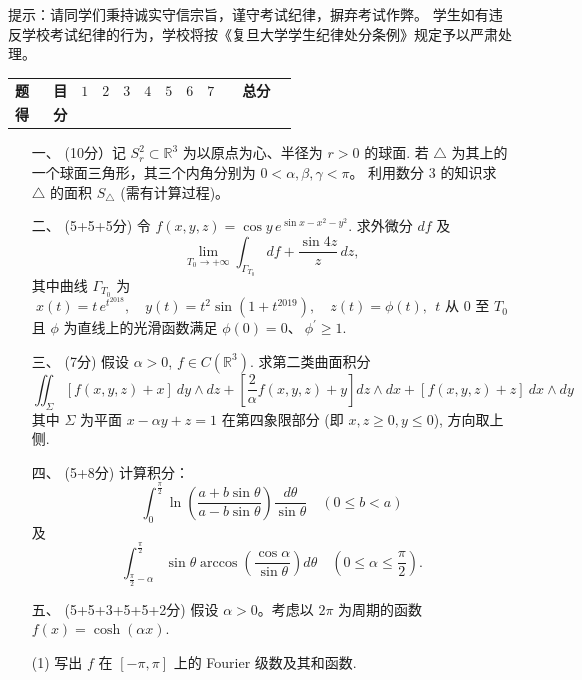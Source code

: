 \qquad 提示：请同学们秉持诚实守信宗旨，谨守考试纪律，摒弃考试作弊。
学生如有违反学校考试纪律的行为，学校将按《复旦大学学生纪律处分条例》规定予以严肃处理。

\begin{table}\begin{tabular}{|c|c|c|c|}
\textbf{题\ \ \ 目} &\quad$1$\quad&\quad$2$\quad&\quad$3$\quad&\quad$4$\quad&\quad$5$\quad&\quad$6$\quad&\quad$7$\quad&\ \ \textbf{总分}\ \ \\
\textbf{得\ \ \ 分} & & & & & & & & 
\end{tabular}\end{table}

\begin{enumerate}
\item[一、] (10分）记 $S_r^2 \subset \mathbb{R}^3$ 为以原点为心、半径为 $r>0$ 的球面. 
若 $\triangle$ 为其上的一个球面三角形，其三个内角分别为 $0<\alpha, \beta, \gamma<\pi$。
利用数分 3 的知识求 $\triangle$ 的面积 $S_{\triangle}$ (需有计算过程)。

\item[二、] (5+5+5分) 令 $f(x, y, z)=\cos y\,e^{\sin x-x^2-y^2}$. 求外微分 $df$ 及
$$\lim_{T_0 \rightarrow+\infty} \int_{\Gamma_{T_0}} df+\frac{\sin 4z}{z}\,dz,$$
其中曲线 $\Gamma_{T_0}$ 为
$$x(t)=t\,e^{t^{2018}}, \quad y(t)=t^2 \sin \left(1+t^{2019}\right), \quad 
z(t)=\phi(t), \ \ t \text { 从 } 0 \text { 至 } T_0$$
且 $\phi$ 为直线上的光滑函数满足 $\phi(0)=0$、$\ \phi^{\prime} \geq 1$.

\item[三、] (7分) 假设 $\alpha>0$, $f \in C(\mathbb{R}^3)$. 求第二类曲面积分
$$\iint_{\Sigma}[f(x, y, z)+x]\ dy \wedge dz
+\left[\frac{2}{\alpha} f(x, y, z)+y\right] dz \wedge dx
+[f(x, y, z)+z]\ dx \wedge dy$$
其中 $\Sigma$ 为平面 $x-\alpha y+z=1$ 在第四象限部分 (即 $x, z \geq 0, y \leq 0$), 方向取上侧.

\item[四、] (5+8分) 计算积分：
$$\int_0^{\frac{\pi}{2}} \ln \left(\frac{a+b \sin \theta}{a-b \sin \theta}\right) \frac{d \theta}{\sin \theta} \quad(0 \leq b<a)$$
及
$$\int_{\frac{\pi}{2}-\alpha}^{\frac{\pi}{2}} \sin \theta \arccos \left(\frac{\cos \alpha}{\sin \theta}\right) d\theta \quad\left(0 \leq \alpha \leq \frac{\pi}{2}\right).$$

\item[五、] (5+5+3+5+5+2分) 假设 $\alpha>0$。考虑以 $2 \pi$ 为周期的函数 $f(x)=\cosh (\alpha x)$.

(1) 写出 $f$ 在 $[-\pi, \pi]$ 上的 Fourier 级数及其和函数.


\end{enumerate}
